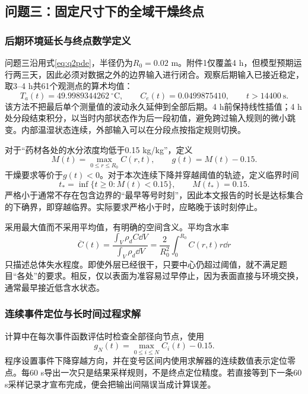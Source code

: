 \subsection{问题三：固定尺寸下的全域干燥终点}
\subsubsection{后期环境延长与终点数学定义}
问题三沿用式\eqref{eq:q2pde}，半径仍为$R_0=0.02$ m。附件1仅覆盖4 h，但模型预期运行两三天，因此必须对数据之外的边界输入进行闭合。观察后期输入已接近稳定，取3--4 h共61个观测点的算术均值：
\begin{equation}
T_a(t)=49.9989344262\ ^\circ\mathrm C,\qquad
C_e(t)=0.0499875410,\qquad t>14400\ \mathrm s .
\label{eq:plateau}
\end{equation}
该方法不把最后单个测量值的波动永久延伸到全部后期。4 h前保持线性插值；4 h处分段结束积分，以当时内部状态作为后一段初值，避免跨过输入规则的微小跳变。内部温湿状态连续，外部输入可以在分段点按指定规则切换。

对于“药材各处的水分浓度均低于0.15 kg/kg”，定义
\begin{equation}
M(t)=\max_{0\le r\le R_0}C(r,t),\qquad
g(t)=M(t)-0.15 .
\end{equation}
干燥要求等价于$g(t)<0$。对于本次连续下降并穿越阈值的轨迹，定义临界时间
\begin{equation}
t_*=\inf\{t\ge0:M(t)<0.15\},\qquad M(t_*)=0.15 .
\label{eq:event}
\end{equation}
严格小于通常不存在包含边界的“最早等号时刻”，因此本文报告的时长是达标集合的下确界，即穿越临界。实际要求严格小于时，应略晚于该时刻停止。

采用最大值而不采用平均值，有明确的空间含义。平均含水率
\begin{equation}
\overline C(t)=
\frac{\int_V\rho_d C\dd V}{\int_V\rho_d\dd V}
=\frac{2}{R_0^2}\int_0^{R_0}C(r,t)r\dd r
\end{equation}
只描述总体失水程度。即使外层已经很干，只要中心仍超过阈值，就不满足题目“各处”的要求。相反，仅以表面为准容易过早停止，因为表面直接与环境交换，通常最早接近低含水状态。


\nextpage
\subsubsection{连续事件定位与长时间过程求解}
计算中在每次事件函数评估时检查全部径向节点，使用
\begin{equation}
g_N(t)=\max_{0\le i\le N}C_i(t)-0.15 .
\end{equation}
程序设置事件下降穿越方向，并在变号区间内使用求解器的连续数值表示定位零点。每60 s导出一次只是结果采样规则，不是终点定位精度。若直接等到下一条60 s采样记录才宣布完成，便会把输出间隔误当成计算误差。

